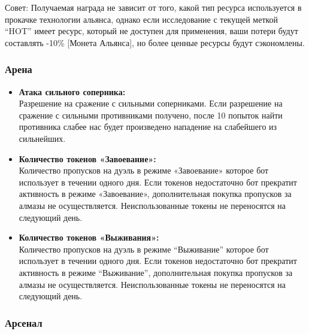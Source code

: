 \documentclass[
]{article}
\begin{document}
Совет: Получаемая награда не зависит от того, какой тип ресурса
используется в прокачке технологии альянса, однако если исследование с
текущей меткой “HOT” имеет ресурс, который не доступен для применения,
ваши потери будут составлять -10\% {[}Монета Альянса{]}, но более ценные
ресурсы будут сэкономлены.

\subsubsection{Арена}\label{ux430ux440ux435ux43dux430-1}

\begin{itemize}
\item
  \textbf{Атака сильного соперника:}\\
  Разрешение на сражение с сильными соперниками. Если разрешение на
  сражение с сильными противниками получено, после 10 попыток найти
  противника слабее нас будет произведено нападение на слабейшего из
  сильнейших.
\item
  \textbf{Количество токенов «Завоевание»:}\\
  Количество пропусков на дуэль в режиме «Завоевание» которое бот
  использует в течении одного дня. Если токенов недостаточно бот
  прекратит активность в режиме «Завоевание», дополнительная покупка
  пропусков за алмазы не осуществляется. Неиспользованные токены не
  переносятся на следующий день.
\item
  \textbf{Количество токенов «Выживания»:}\\
  Количество пропусков на дуэль в режиме “Выживание” которое бот
  использует в течении одного дня. Если токенов недостаточно бот
  прекратит активность в режиме “Выживание”, дополнительная покупка
  пропусков за алмазы не осуществляется. Неиспользованные токены не
  переносятся на следующий день.
\end{itemize}

\subsubsection{Арсенал}\label{ux430ux440ux441ux435ux43dux430ux43b-1}
\end{document}

